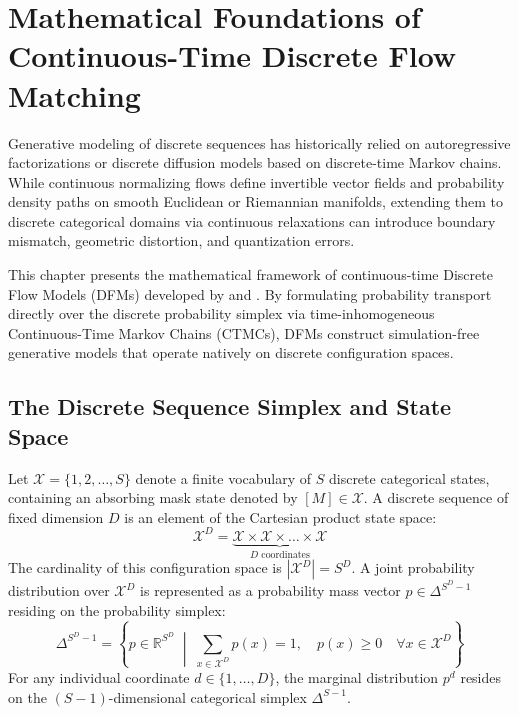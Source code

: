 \chapter{Mathematical Foundations of Continuous-Time Discrete Flow Matching}

Generative modeling of discrete sequences has historically relied on autoregressive factorizations or discrete diffusion models based on discrete-time Markov chains. While continuous normalizing flows \citep{Chen2018, Lipman2023} define invertible vector fields and probability density paths on smooth Euclidean or Riemannian manifolds, extending them to discrete categorical domains via continuous relaxations \citep{Stark2024} can introduce boundary mismatch, geometric distortion, and quantization errors. 

This chapter presents the mathematical framework of continuous-time Discrete Flow Models (DFMs) developed by \citet{Campbell2024} and \citet{Gat2024}. By formulating probability transport directly over the discrete probability simplex via time-inhomogeneous Continuous-Time Markov Chains (CTMCs), DFMs construct simulation-free generative models that operate natively on discrete configuration spaces.

\section{The Discrete Sequence Simplex and State Space}

Let $\mathcal{X} = \{1, 2, \dots, S\}$ denote a finite vocabulary of $S$ discrete categorical states, containing an absorbing mask state denoted by $[M] \in \mathcal{X}$. A discrete sequence of fixed dimension $D$ is an element of the Cartesian product state space:
\begin{equation}
\mathcal{X}^D = \underbrace{\mathcal{X} \times \mathcal{X} \times \dots \times \mathcal{X}}_{D \text{ coordinates}}
\label{eq:state_space_def}
\end{equation}
The cardinality of this configuration space is $|\mathcal{X}^D| = S^D$. A joint probability distribution over $\mathcal{X}^D$ is represented as a probability mass vector $p \in \Delta^{S^D - 1}$ residing on the probability simplex:
\begin{equation}
\Delta^{S^D - 1} = \left\{ p \in \mathbb{R}^{S^D} \;\middle|\; \sum_{x \in \mathcal{X}^D} p(x) = 1, \quad p(x) \ge 0 \quad \forall x \in \mathcal{X}^D \right\}
\label{eq:simplex_def}
\end{equation}
For any individual coordinate $d \in \{1, \dots, D\}$, the marginal distribution $p^d$ resides on the $(S-1)$-dimensional categorical simplex $\Delta^{S-1}$.

